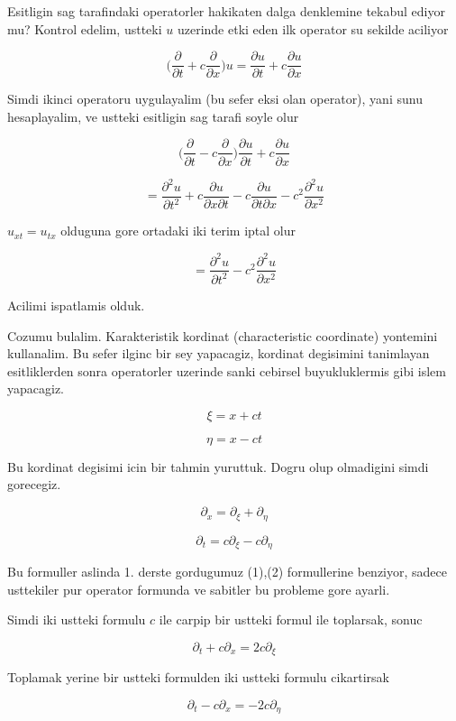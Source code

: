 \documentclass[12pt,fleqn]{article}
\begin{document}
Esitligin sag tarafindaki operatorler hakikaten dalga denklemine tekabul
ediyor mu? Kontrol edelim, ustteki $u$ uzerinde etki eden ilk operator su
sekilde aciliyor

\[ \bigg( \frac{\partial }{\partial t} + c \frac{\partial }{\partial x}
\bigg) u = 
\frac{\partial u}{\partial t} + c \frac{\partial u}{\partial x}
\]

Simdi ikinci operatoru uygulayalim (bu sefer eksi olan operator), yani sunu
hesaplayalim, ve ustteki esitligin sag tarafi soyle olur

\[ 
\bigg( \frac{\partial }{\partial t} - c \frac{\partial }{\partial x} \bigg)
\frac{\partial u}{\partial t} + c \frac{\partial u}{\partial x} 
 \]

\[ = 
\frac{\partial ^2 u}{\partial t^2} + 
c \frac{\partial u}{\partial x \partial t} - 
c \frac{\partial u}{\partial t \partial x} - 
c^2\frac{\partial ^2 u}{\partial x^2} 
 \]

$u_{xt} = u_{tx}$ olduguna gore ortadaki iki terim iptal olur

\[ = 
\frac{\partial ^2 u}{\partial t^2} -
c^2\frac{\partial ^2 u}{\partial x^2} 
 \]

Acilimi ispatlamis olduk. 

Cozumu bulalim. Karakteristik kordinat (characteristic coordinate)
yontemini kullanalim. Bu sefer ilginc bir sey yapacagiz, kordinat
degisimini tanimlayan esitliklerden sonra operatorler uzerinde sanki
cebirsel buyukluklermis gibi islem yapacagiz. 

\[ \xi = x + ct \]

\[ \eta = x - ct \]

Bu kordinat degisimi icin bir tahmin yuruttuk. Dogru olup olmadigini simdi
gorecegiz. 

\[ \partial_x = \partial_\xi + \partial_\eta \]

\[ \partial_t = c\partial_\xi - c \partial_\eta \]

Bu formuller aslinda 1. derste gordugumuz (1),(2) formullerine benziyor,
sadece usttekiler pur operator formunda ve sabitler bu probleme gore
ayarli. 

Simdi iki ustteki formulu $c$ ile carpip bir ustteki formul ile toplarsak,
sonuc 

\[ \partial_t + c\partial_x = 2c \partial_\xi \]

Toplamak yerine bir ustteki formulden iki ustteki formulu cikartirsak

\[ \partial_t - c\partial_x = -2c \partial_\eta \]
\end{document}
